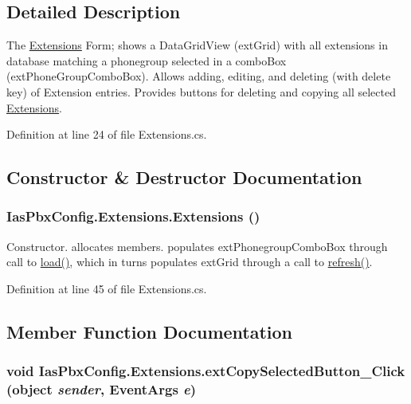 \subsection{Detailed Description}
The \hyperlink{class_ias_pbx_config_1_1_extensions}{Extensions} Form; shows a DataGridView (extGrid) with all extensions in database matching a phonegroup selected in a comboBox (extPhoneGroupComboBox). Allows adding, editing, and deleting (with delete key) of Extension entries. Provides buttons for deleting and copying all selected \hyperlink{class_ias_pbx_config_1_1_extensions}{Extensions}. 

Definition at line 24 of file Extensions.cs.

\subsection{Constructor \& Destructor Documentation}
\hypertarget{class_ias_pbx_config_1_1_extensions_a424a45774e493b24d6162f1602b5d618}{
\subsubsection[{Extensions}]{\setlength{\rightskip}{0pt plus 5cm}IasPbxConfig.Extensions.Extensions ()}}
\label{class_ias_pbx_config_1_1_extensions_a424a45774e493b24d6162f1602b5d618}


Constructor. allocates members. populates extPhonegroupComboBox through call to \hyperlink{class_ias_pbx_config_1_1_extensions_ae4bb3f156ed11b990645abf3ec68e168}{load()}, which in turns populates extGrid through a call to \hyperlink{class_ias_pbx_config_1_1_extensions_a701d940ae6c6d38e9bc691af071d091b}{refresh()}. 

Definition at line 45 of file Extensions.cs.

\subsection{Member Function Documentation}
\hypertarget{class_ias_pbx_config_1_1_extensions_a7f5da0e8d8f000a57ad169d728d82724}{
\subsubsection[{extCopySelectedButton\_\-Click}]{\setlength{\rightskip}{0pt plus 5cm}void IasPbxConfig.Extensions.extCopySelectedButton\_\-Click (object {\em sender}, \/  EventArgs {\em e})}}
\label{class_ias_pbx_config_1_1_extensions_a7f5da0e8d8f000a57ad169d728d82724}


